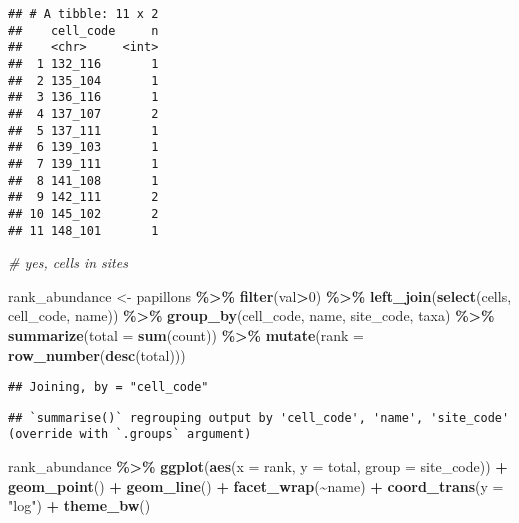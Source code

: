 \documentclass[
]{book}
\newenvironment{Shaded}{\begin{snugshade}}{\end{snugshade}}
\newcommand{\CommentTok}[1]{\textcolor[rgb]{0.56,0.35,0.01}{\textit{#1}}}
\newcommand{\DataTypeTok}[1]{\textcolor[rgb]{0.13,0.29,0.53}{#1}}
\newcommand{\DecValTok}[1]{\textcolor[rgb]{0.00,0.00,0.81}{#1}}
\newcommand{\KeywordTok}[1]{\textcolor[rgb]{0.13,0.29,0.53}{\textbf{#1}}}
\newcommand{\NormalTok}[1]{#1}
\newcommand{\OperatorTok}[1]{\textcolor[rgb]{0.81,0.36,0.00}{\textbf{#1}}}
\newcommand{\StringTok}[1]{\textcolor[rgb]{0.31,0.60,0.02}{#1}}
\begin{document}
\begin{verbatim}
## # A tibble: 11 x 2
##    cell_code     n
##    <chr>     <int>
##  1 132_116       1
##  2 135_104       1
##  3 136_116       1
##  4 137_107       2
##  5 137_111       1
##  6 139_103       1
##  7 139_111       1
##  8 141_108       1
##  9 142_111       2
## 10 145_102       2
## 11 148_101       1
\end{verbatim}

\begin{Shaded}
\begin{Highlighting}[]
\CommentTok{\# yes, cells in sites }
\end{Highlighting}
\end{Shaded}

\begin{Shaded}
\begin{Highlighting}[]
\NormalTok{rank\_abundance \textless{}{-}}\StringTok{ }\NormalTok{papillons }\OperatorTok{\%\textgreater{}\%}\StringTok{ }
\StringTok{  }\KeywordTok{filter}\NormalTok{(val}\OperatorTok{\textgreater{}}\DecValTok{0}\NormalTok{) }\OperatorTok{\%\textgreater{}\%}\StringTok{ }
\StringTok{  }\KeywordTok{left\_join}\NormalTok{(}\KeywordTok{select}\NormalTok{(cells, cell\_code, name)) }\OperatorTok{\%\textgreater{}\%}\StringTok{ }
\StringTok{  }\KeywordTok{group\_by}\NormalTok{(cell\_code, name, site\_code, taxa) }\OperatorTok{\%\textgreater{}\%}\StringTok{  }
\StringTok{  }\KeywordTok{summarize}\NormalTok{(}\DataTypeTok{total =} \KeywordTok{sum}\NormalTok{(count)) }\OperatorTok{\%\textgreater{}\%}\StringTok{ }
\StringTok{  }\KeywordTok{mutate}\NormalTok{(}\DataTypeTok{rank =} \KeywordTok{row\_number}\NormalTok{(}\KeywordTok{desc}\NormalTok{(total)))}
\end{Highlighting}
\end{Shaded}

\begin{verbatim}
## Joining, by = "cell_code"
\end{verbatim}

\begin{verbatim}
## `summarise()` regrouping output by 'cell_code', 'name', 'site_code' (override with `.groups` argument)
\end{verbatim}

\begin{Shaded}
\begin{Highlighting}[]
\NormalTok{rank\_abundance }\OperatorTok{\%\textgreater{}\%}\StringTok{ }
\StringTok{  }\KeywordTok{ggplot}\NormalTok{(}\KeywordTok{aes}\NormalTok{(}\DataTypeTok{x =}\NormalTok{ rank, }\DataTypeTok{y =}\NormalTok{ total, }\DataTypeTok{group =}\NormalTok{ site\_code)) }\OperatorTok{+}\StringTok{ }
\StringTok{  }\KeywordTok{geom\_point}\NormalTok{() }\OperatorTok{+}\StringTok{ }
\StringTok{  }\KeywordTok{geom\_line}\NormalTok{() }\OperatorTok{+}\StringTok{ }
\StringTok{  }\KeywordTok{facet\_wrap}\NormalTok{(}\OperatorTok{\textasciitilde{}}\NormalTok{name) }\OperatorTok{+}\StringTok{ }
\StringTok{  }\KeywordTok{coord\_trans}\NormalTok{(}\DataTypeTok{y =} \StringTok{"log"}\NormalTok{) }\OperatorTok{+}\StringTok{ }
\StringTok{  }\KeywordTok{theme\_bw}\NormalTok{()}
\end{Highlighting}
\end{Shaded}
\end{document}
